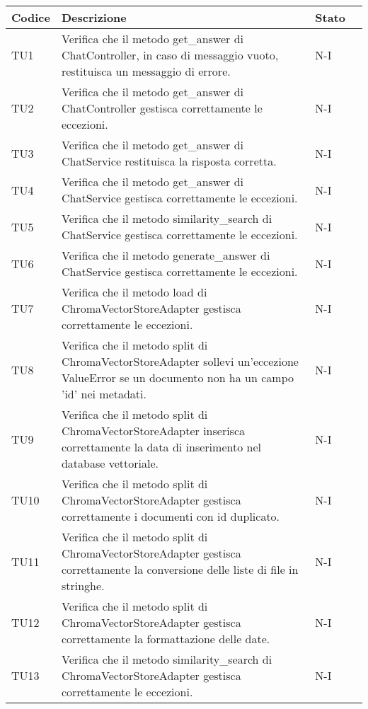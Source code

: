 \begin{table}[h!]
    \centering
    \renewcommand{\arraystretch}{1.5}
    \begin{tabularx}{\textwidth}{|p{}|X|p{}|p{}|}\hline
    \rowcolor[HTML]{FFD700}
    \textbf{Codice} & \textbf{Descrizione}  & \textbf{Stato} \\ \hline
    TU1 & Verifica che il metodo get\_answer di ChatController, in caso di messaggio vuoto, restituisca un messaggio di errore. &  N-I \\ \hline
    TU2 & Verifica che il metodo get\_answer di ChatController gestisca correttamente le eccezioni. &  N-I \\ \hline
    TU3 & Verifica che il metodo get\_answer di ChatService restituisca la risposta corretta. &  N-I \\ \hline
    TU4 & Verifica che il metodo get\_answer di ChatService gestisca correttamente le eccezioni. &  N-I \\ \hline
    TU5 & Verifica che il metodo similarity\_search di ChatService gestisca correttamente le eccezioni. &  N-I \\ \hline
    TU6 & Verifica che il metodo generate\_answer di ChatService gestisca correttamente le eccezioni. &  N-I \\ \hline
    TU7 & Verifica che il metodo load di ChromaVectorStoreAdapter gestisca correttamente le eccezioni. &  N-I \\ \hline
    TU8 & Verifica che il metodo split di ChromaVectorStoreAdapter sollevi un'eccezione ValueError se un documento non ha un campo 'id' nei metadati. &  N-I \\ \hline
    TU9 & Verifica che il metodo split di ChromaVectorStoreAdapter inserisca correttamente la data di inserimento nel database vettoriale. &  N-I \\ \hline
    TU10 & Verifica che il metodo split di ChromaVectorStoreAdapter gestisca correttamente i documenti con id duplicato. &  N-I \\ \hline
    TU11 & Verifica che il metodo split di ChromaVectorStoreAdapter gestisca correttamente la conversione delle liste di file in stringhe. &  N-I \\ \hline
    TU12 & Verifica che il metodo split di ChromaVectorStoreAdapter gestisca correttamente la formattazione delle date. &  N-I \\ \hline
    TU13 & Verifica che il metodo similarity\_search di ChromaVectorStoreAdapter gestisca correttamente le eccezioni. &  N-I \\ \hline

\end{tabularx}
\end{table}

